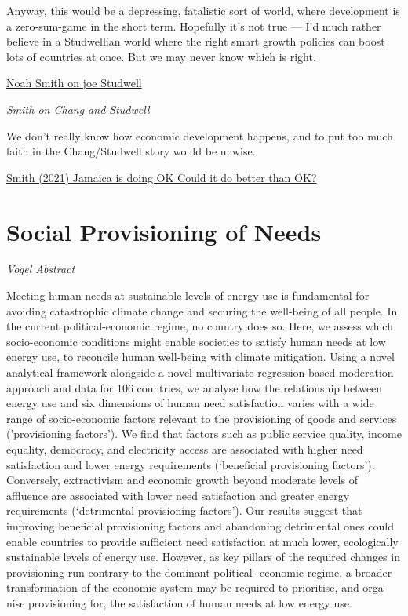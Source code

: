 \documentclass[
]{book}
\begin{document}
Anyway, this would be a depressing, fatalistic sort of world, where development is a zero-sum-game in the short term. Hopefully it's not true --- I'd much rather believe in a Studwellian world where the right smart growth policies can boost lots of countries at once. But we may never know which is right.

\href{https://noahpinion.substack.com/p/what-studwell-got-wrong}{Noah Smith on joe Studwell}

\emph{Smith on Chang and Studwell}

We don't really know how economic development happens, and to put too much faith in the Chang/Studwell story would be unwise.

\href{https://noahpinion.subst\%20ack.com/p/jamaica-is-doing-ok}{Smith (2021) Jamaica is doing OK Could it do better than OK?}

\hypertarget{social-provisioning-of-needs}{%
\section{Social Provisioning of Needs}\label{social-provisioning-of-needs}}

\emph{Vogel Abstract}

Meeting human needs at sustainable levels of energy use is fundamental for avoiding catastrophic climate change
and securing the well-being of all people. In the current political-economic regime, no country does so. Here, we
assess which socio-economic conditions might enable societies to satisfy human needs at low energy use, to
reconcile human well-being with climate mitigation.
Using a novel analytical framework alongside a novel multivariate regression-based moderation approach and
data for 106 countries, we analyse how the relationship between energy use and six dimensions of human need
satisfaction varies with a wide range of socio-economic factors relevant to the provisioning of goods and services
('provisioning factors'). We find that factors such as public service quality, income equality, democracy, and
electricity access are associated with higher need satisfaction and lower energy requirements (`beneficial
provisioning factors'). Conversely, extractivism and economic growth beyond moderate levels of affluence are
associated with lower need satisfaction and greater energy requirements (`detrimental provisioning factors'). Our
results suggest that improving beneficial provisioning factors and abandoning detrimental ones could enable
countries to provide sufficient need satisfaction at much lower, ecologically sustainable levels of energy use.
However, as key pillars of the required changes in provisioning run contrary to the dominant political-
economic regime, a broader transformation of the economic system may be required to prioritise, and orga­
nise provisioning for, the satisfaction of human needs at low energy use.
\end{document}
